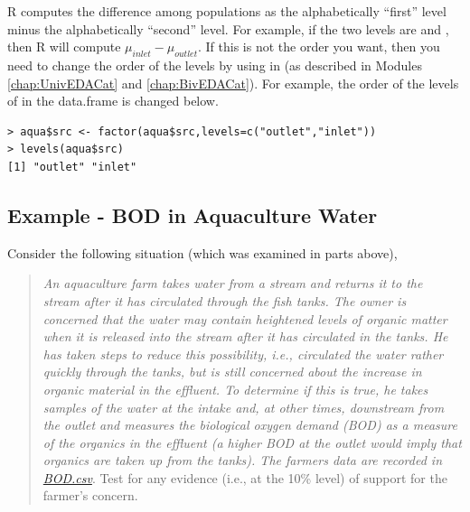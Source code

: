 \documentclass[10pt,openany]{book}\usepackage[]{graphicx}\usepackage[]{color}
\makeatletter
\newenvironment{kframe}{%
 \def\at@end@of@kframe{}%
 \ifinner\ifhmode%
  \def\at@end@of@kframe{\end{minipage}}%
  \begin{minipage}{\columnwidth}%
 \fi\fi%
 \def\FrameCommand##1{\hskip\@totalleftmargin \hskip-\fboxsep
 \colorbox{shadecolor}{##1}\hskip-\fboxsep
     \hskip-\linewidth \hskip-\@totalleftmargin \hskip\columnwidth}%
 \MakeFramed {\advance\hsize-\width
   \@totalleftmargin\z@ \linewidth\hsize
   \@setminipage}}%
 {\par\unskip\endMakeFramed%
 \at@end@of@kframe}
\newenvironment{knitrout}{}{} %
\makeatother
\begin{document}

R computes the difference among populations as the alphabetically ``first'' level minus the alphabetically ``second'' level.  For example, if the two levels are  and , then R will compute $\mu_{inlet}-\mu_{outlet}$.  If this is not the order you want, then you need to change the order of the levels by using  in  (as described in Modules \ref{chap:UnivEDACat} and \ref{chap:BivEDACat}).  For example, the order of the levels of  in the  data.frame is changed below.
\begin{knitrout}
\color{fgcolor}\begin{kframe}
\begin{verbatim}
> aqua$src <- factor(aqua$src,levels=c("outlet","inlet"))
> levels(aqua$src)
[1] "outlet" "inlet" 
\end{verbatim}
\end{kframe}
\end{knitrout}

\subsection{Example - BOD in Aquaculture Water}
Consider the following situation (which was examined in parts above),
\begin{quote}
\textsl{An aquaculture farm takes water from a stream and returns it to the stream after it has circulated through the fish tanks.  The owner is concerned that the water may contain heightened levels of organic matter when it is released into the stream after it has circulated in the tanks.  He has taken steps to reduce this possibility, i.e., circulated the water rather quickly through the tanks, but is still concerned about the increase in organic material in the effluent.  To determine if this is true, he takes samples of the water at the intake and, at other times, downstream from the outlet and measures the biological oxygen demand (BOD) as a measure of the organics in the effluent (a higher BOD at the outlet would imply that organics are taken up from the tanks).  The farmers data are recorded in \href{https://raw.githubusercontent.com/droglenc/NCData/master/BOD.csv}{BOD.csv}}.  Test for any evidence (i.e., at the 10\% level) of support for the farmer's concern.
\end{quote}
\end{document}
